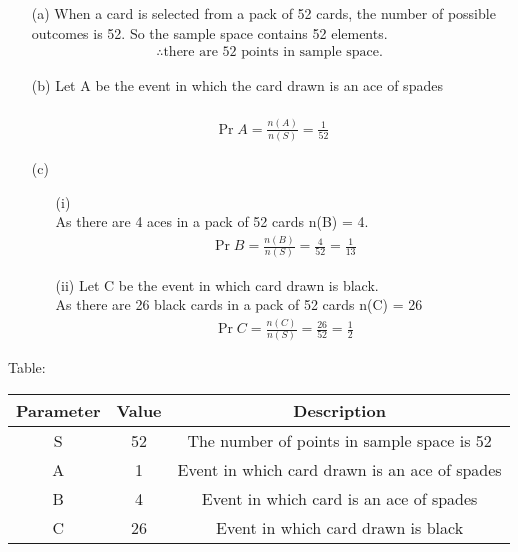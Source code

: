 \documentclass[journal,12pt,twocolumn]{IEEEtran}
\begin{document}
\begin{enumerate}
\item[(a)] When a card is selected from a pack of 52 cards, the number of possible outcomes is 52. So the sample space contains 52 elements.\\
\begin{align}
\therefore \text{there are 52 points in sample space. }
\end{align}
\item[(b)] Let A be the event in which the card drawn is an ace of spades\\
\\
\begin{align}
\Pr{A} = \frac{n(A)}{n(S)} = \frac{1}{52}
\end{align}
\item[(c)]  
\begin{enumerate}
\item[(i)] \\
As there are 4 aces in a pack of 52 cards n(B) = 4.
\begin{align}
\Pr{B} = \frac{n(B)}{n(S)} = \frac{4}{52} = \frac{1}{13}    
\end{align}
\item[(ii)] Let C be the event in which card drawn is black.\\
As there are 26 black cards in a pack of 52 cards n(C) = 26
\begin{align}
\Pr{C} = \frac{n(C)}{n(S)} = \frac{26}{52} = \frac{1}{2}     
\end{align}
\end{enumerate}
\end{enumerate}
Table:\\
\begin{tabular}{|c|c|c|} \hline
Parameter & Value & Description\\ \hline
S &  52 & The number of points in sample space is 52\\ \hline  
A  & 1 & Event in which card drawn is an ace of spades\\ \hline
B & 4 & Event in which card is an ace of spades\\ \hline
C & 26 & Event in which card drawn is black\\ \hline
\end{tabular}
\end{document}
